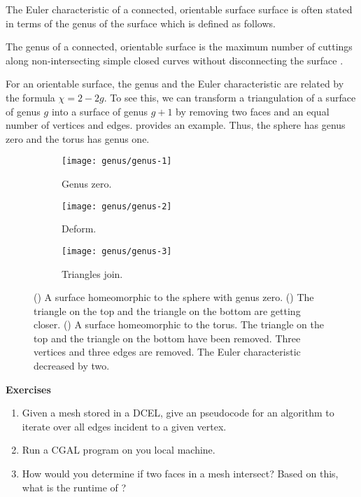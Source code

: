 The Euler characteristic of a connected, orientable surface surface is often 
stated in terms of the genus of the surface which is defined as follows.
\begin{definition}\label{def:genus}
	The genus of a connected, orientable surface is the maximum number of
	cuttings along non-intersecting simple closed curves without disconnecting
	the surface \cite{munkres}.
\end{definition}


For an orientable surface, the genus and the Euler characteristic are related by
the formula $\chi=2-2g$. To see this, we can transform a triangulation of a surface of
genus $g$ into a surface of genus $g+1$ by removing two faces and an equal number
of vertices and edges.  provides an example.
Thus, the sphere has genus zero and the torus has genus one.


\begin{figure}[htb]
        \centering
        \begin{subfigure}[b]{0.2\textwidth}
        \texttt{[image: genus/genus-1]}
        \caption{Genus zero.}
          \label{fig:initial-sphere}
        \end{subfigure}
          \hspace{.5cm}
         \begin{subfigure}[b]{0.2\textwidth}
        \texttt{[image: genus/genus-2]}
        \caption{Deform.}
        \label{fig:decending-faces}
        \end{subfigure}
          \hspace{.5cm}
         \begin{subfigure}[b]{0.2\textwidth}
        \texttt{[image: genus/genus-3]}
        \caption{Triangles join.}
        \label{fig:faces-join}
        \end{subfigure}
		\caption{() A surface homeomorphic to the sphere with genus zero.
		() The triangle on the top and the triangle on the bottom are getting
		closer. ()  A surface homeomorphic to the torus. The triangle on the top
		and the triangle on the bottom have been removed. Three vertices and three edges are				removed. The Euler characteristic decreased by two.
		\label{fig:genus}}
\end{figure}

\noindent \textbf{Exercises}


\begin{enumerate}
	\item Given a mesh stored in a DCEL, give an pseudocode for an algorithm to iterate over all edges incident to a given vertex.
	
	\item Run a CGAL program on you local machine.
	
	\item How would you determine if two faces in a mesh intersect? Based on this, what is the runtime of ?
	
\end{enumerate}

\pagebreak